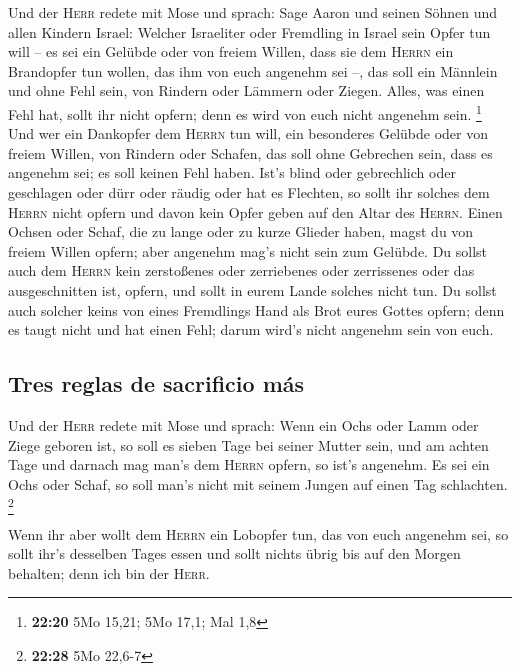  Und der \textsc{Herr} redete mit Mose und sprach:
 Sage Aaron und seinen Söhnen und allen Kindern Israel:
Welcher Israeliter oder Fremdling in Israel sein Opfer tun will -- es
sei ein Gelübde oder von freiem Willen, dass sie dem \textsc{Herrn} ein
Brandopfer tun wollen, das ihm von euch angenehm sei --, 
das soll ein Männlein und ohne Fehl sein, von Rindern oder Lämmern oder
Ziegen.  Alles, was einen Fehl hat, sollt ihr nicht
opfern; denn es wird von euch nicht angenehm sein. \footnote{\textbf{22:20}
  5Mo 15,21; 5Mo 17,1; Mal 1,8}  Und wer ein Dankopfer
dem \textsc{Herrn} tun will, ein besonderes Gelübde oder von freiem
Willen, von Rindern oder Schafen, das soll ohne Gebrechen sein, dass es
angenehm sei; es soll keinen Fehl haben.  Ist's blind
oder gebrechlich oder geschlagen oder dürr oder räudig oder hat es
Flechten, so sollt ihr solches dem \textsc{Herrn} nicht opfern und davon
kein Opfer geben auf den Altar des \textsc{Herrn}.  Einen
Ochsen oder Schaf, die zu lange oder zu kurze Glieder haben, magst du
von freiem Willen opfern; aber angenehm mag's nicht sein zum Gelübde.
 Du sollst auch dem \textsc{Herrn} kein zerstoßenes oder
zerriebenes oder zerrissenes oder das ausgeschnitten ist, opfern, und
sollt in eurem Lande solches nicht tun.  Du sollst auch
solcher keins von eines Fremdlings Hand als Brot eures Gottes opfern;
denn es taugt nicht und hat einen Fehl; darum wird's nicht angenehm sein
von euch.

\hypertarget{tres-reglas-de-sacrificio-muxe1s}{%
\subsection{Tres reglas de sacrificio
más}\label{tres-reglas-de-sacrificio-muxe1s}}

 Und der \textsc{Herr} redete mit Mose und sprach:
 Wenn ein Ochs oder Lamm oder Ziege geboren ist, so soll
es sieben Tage bei seiner Mutter sein, und am achten Tage und darnach
mag man's dem \textsc{Herrn} opfern, so ist's angenehm. 
Es sei ein Ochs oder Schaf, so soll man's nicht mit seinem Jungen auf
einen Tag schlachten. \footnote{\textbf{22:28} 5Mo 22,6-7}

 Wenn ihr aber wollt dem \textsc{Herrn} ein Lobopfer tun,
das von euch angenehm sei,  so sollt ihr's desselben
Tages essen und sollt nichts übrig bis auf den Morgen behalten; denn ich
bin der \textsc{Herr}.

